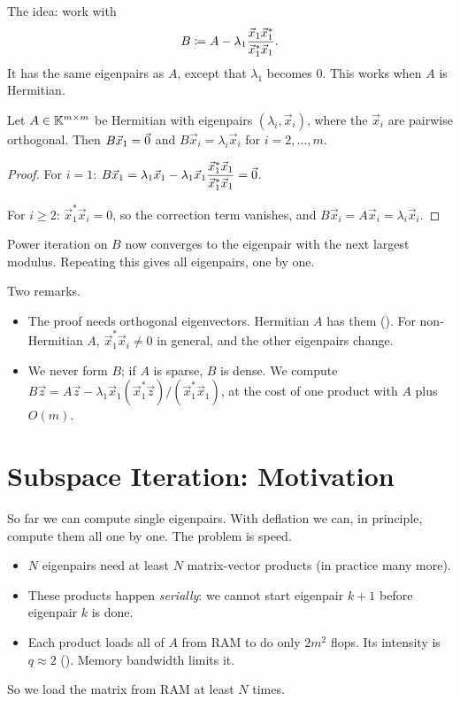 The idea: work with
\begin{equation}
  B \coloneqq A - \lambda_1\frac{\vec{x}_1\vec{x}_1^\ast}{\vec{x}_1^\ast\vec{x}_1}.
\end{equation}
It has the same eigenpairs as $A$, except that $\lambda_1$ becomes $0$. This works when $A$ is Hermitian.

\begin{proposition}
  \label{prop:hotelling}
  Let $A \in \mathbb{K}^{m \times m}$ be Hermitian with eigenpairs $(\lambda_i, \vec{x}_i)$, where the $\vec{x}_i$ are pairwise orthogonal. Then $B\vec{x}_1 = \vec{0}$ and $B\vec{x}_i = \lambda_i\vec{x}_i$ for $i = 2, \dots, m$.
\end{proposition}

\begin{proof}
  For $i = 1$: $B\vec{x}_1 = \lambda_1\vec{x}_1 - \lambda_1\vec{x}_1\dfrac{\vec{x}_1^\ast\vec{x}_1}{\vec{x}_1^\ast\vec{x}_1} = \vec{0}$.

  For $i \ge 2$: $\vec{x}_1^\ast\vec{x}_i = 0$, so the correction term vanishes, and $B\vec{x}_i = A\vec{x}_i = \lambda_i\vec{x}_i$.
\end{proof}

Power iteration on $B$ now converges to the eigenpair with the next largest modulus. Repeating this gives all eigenpairs, one by one.

Two remarks.
\begin{itemize}
  \item The proof needs orthogonal eigenvectors. Hermitian $A$ has them (). For non-Hermitian $A$, $\vec{x}_1^\ast\vec{x}_i \ne 0$ in general, and the other eigenpairs change.
  \item We never form $B$; if $A$ is sparse, $B$ is dense. We compute $B\vec{z} = A\vec{z} - \lambda_1\vec{x}_1(\vec{x}_1^\ast\vec{z})/(\vec{x}_1^\ast\vec{x}_1)$, at the cost of one product with $A$ plus $O(m)$.
\end{itemize}

\section{Subspace Iteration: Motivation}
\label{sec:subspace-motivation}

So far we can compute single eigenpairs. With deflation we can, in principle, compute them all one by one. The problem is speed.
\begin{itemize}
  \item $N$ eigenpairs need at least $N$ matrix-vector products (in practice many more).
  \item These products happen \emph{serially}: we cannot start eigenpair $k + 1$ before eigenpair $k$ is done.
  \item Each product loads all of $A$ from RAM to do only $2m^2$ flops. Its intensity is $q \approx 2$ (). Memory bandwidth limits it.
\end{itemize}
So we load the matrix from RAM at least $N$ times.

